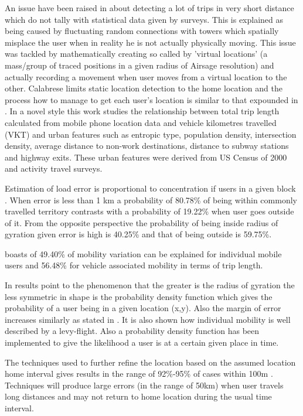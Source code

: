 \documentclass[12pt, a4paper]{report}
\theoremstyle{definition}
\theoremstyle{definition}%
\theoremstyle{definition}%
\theoremstyle{definition}%
\theoremstyle{definition}%
\theoremstyle{definition}%
\begin{document}
An issue have been raised in \cite{Calabrese2013} about detecting a lot of trips in very short distance which do not tally with statistical data given by surveys. This is explained as being caused by fluctuating random connections with towers which spatially misplace the user when in reality he is not actually physically moving. This issue was tackled by mathematically creating so called by \cite{Calabrese2013} 'virtual locations' (a mass/group of traced positions in a given radius of Airsage resolution) and actually recording a movement when user moves from a virtual location to the other. Calabrese limits static location detection to the home location and the process how to manage to get each user's location is similar to that expounded in \cite{Hoteit2016}. In a novel style this work studies the relationship between total trip length calculated from mobile phone location data and vehicle kilometres travelled (VKT) and urban features such as entropic type, population density, intersection density, average distance to non-work destinations, distance to subway stations and highway exits. These urban features were derived from US Census of 2000 and activity travel surveys.

Estimation of load error is proportional to concentration if users in a given block \cite{Hoteit2014}. When error is less than 1 km a probability of 80.78\% of being within commonly travelled territory contrasts with a probability of 19.22\% when user goes outside of it. From the opposite perspective the probability of being inside radius of gyration given error is high is 40.25\% and that of being outside is 59.75\%.

\cite{Calabrese2013} boasts of 49.40\% of mobility variation can be explained for individual mobile users and 56.48\% for vehicle associated mobility in terms of trip length.    

In \cite{Gonzalez2008} results point to the phenomenon that the greater is the radius of gyration the less symmetric in shape is the probability density function which gives the probability of a user being in a given location (x,y). Also the margin of error increases similarly as stated in \cite{Hoteit2014}. It is also shown how individual mobility is well described by a levy-flight. Also a probability density function has been implemented to give the likelihood a user is at a certain given place in time.

The techniques used to further refine the location based on the assumed location home interval gives results in the range of 92\%-95\% of cases within 100m \cite{Hoteit2016}. Techniques will produce large errors (in the range of 50km) when user travels long distances and may not return to home location during the usual time interval.
\end{document}

